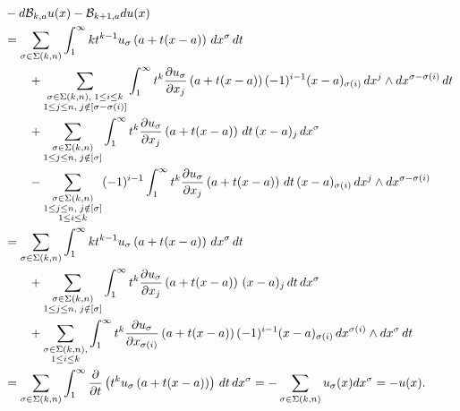 \documentclass[10pt,a4paper]{article}
\begin{document}
\begin{align*}
    &
    - 
    d {\mathcal B}_{k,a} u(x)
    -
    {\mathcal B}_{k+1,a} d u(x)
    \\&
    =
    \sum_{\sigma \in \Sigma(k,n)} 
    \int_{1}^{\infty} 
    k t^{k-1} u_{\sigma}\left(a+t(x-a)\right) \,dx^{\sigma} \,dt 
    \\&\qquad
    + 
    \sum_{\substack{ \sigma \in \Sigma(k,n), \; 1 \leq i \leq k \\ 1 \leq j \leq n, \; j \notin [\sigma-\sigma(i)] }}
    \int_{1}^{\infty} 
    t^{k} \frac{ \partial u_{\sigma} }{\partial x_{j}}\left(a+t(x-a)\right) (-1)^{i-1} (x-a)_{\sigma(i) } \,dx^{j} \wedge dx^{\sigma-\sigma(i)} \,dt 
    \\&\qquad
    +
    \sum_{\substack{ \sigma \in \Sigma(k,n) \\ 1 \leq j \leq n, \; j \notin [\sigma] }} 
    \int_{1}^{\infty} t^{k} \frac{ \partial u_{\sigma} }{\partial x_{j}}\left(a+t(x-a)\right) \,dt \,(x-a)_{j} \,dx^{\sigma}
    \\&\qquad
    - 
    \sum_{\substack{ \sigma \in \Sigma(k,n) \\ 1 \leq j \leq n, \; j \notin [\sigma] \\ 1 \leq i \leq k }}
    (-1)^{i-1}
    \int_{1}^{\infty} t^{k} \frac{ \partial u_{\sigma} }{\partial x_{j}}\left(a+t(x-a)\right) \,dt 
    \,(x-a)_{\sigma(i)} \,dx^{j} \wedge dx^{\sigma-\sigma(i)}
    \\&
    =
    \sum_{\sigma \in \Sigma(k,n)} 
    \int_{1}^{\infty} 
    k t^{k-1} u_{\sigma}\left(a+t(x-a)\right) \,dx^{\sigma} \,dt 
    \\&\qquad
    +
    \sum_{\substack{ \sigma \in \Sigma(k,n) \\ 1 \leq j \leq n, \; j \notin [\sigma] }} 
    \int_{1}^{\infty} t^{k} \frac{ \partial u_{\sigma} }{\partial x_{j}}\left(a+t(x-a)\right) \,(x-a)_{j} \,dt \,dx^{\sigma}
    \\&\qquad
    + 
    \sum_{\substack{ \sigma \in \Sigma(k,n), \\ 1 \leq i \leq k }}
    \int_{1}^{\infty} 
    t^{k} \frac{ \partial u_{\sigma} }{\partial x_{\sigma(i)}}\left(a+t(x-a)\right) (-1)^{i-1} (x-a)_{\sigma(i) } \,dx^{\sigma(i)} \wedge dx^{\sigma} \,dt 
    \\&
    =
    \sum_{\sigma \in \Sigma(k,n)} 
    \int_{1}^{\infty} \frac{\partial}{\partial t} \left( t^{k} u_{\sigma}\left(a+t(x-a)\right) \right) \,dt \,dx^{\sigma}
    =
    -
	\sum_{\sigma \in \Sigma(k,n)} 
    u_{\sigma}(x) dx^{\sigma}
    =
    -u(x)
    .
\end{align*}
\end{document}
